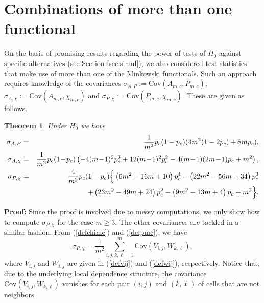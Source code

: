\documentclass[12pt]{article}
\newtheorem{theorem}{\bf{Theorem}}[section]
\begin{document}







\section{Combinations of more than one functional}\label{sec:3Mink.test}
On the basis of promising results regarding the power of tests of $H_0$ against specific alternatives (see Section \ref{sec:simul}), we also considered test statistics
that make use of more than one of the Minkowski functionals. Such an approach requires knowledge of the covariances
$\sigma_{A,P}:=\mbox{Cov}(A_{m,c},P_{m,c})$, $\sigma_{A,\chi}:=\mbox{Cov}(A_{m,c},\chi_{m,c})$ and $\sigma_{P,\chi}:=\mbox{Cov}(P_{m,c},\chi_{m,c})$. These are given as follows.
\begin{theorem}\label{covarMF} Under $H_0$ we have
\begin{eqnarray*}
\sigma_{A,P}&=&\frac{1}{m^2}p_c(1-p_c)(4m^2(1-2p_c)+8mp_c),\\
\sigma_{A,\chi}&=&\frac{1}{m^2}p_c(1\! -\! p_c)\left(-4(m\! -\! 1)^2p_c^3+12(m\! -\! 1)^2p_c^2-4(m\! -\! 1)(2m\! -\! 1)p_c+m^2\right),\\
\sigma_{P,\chi}&=&\frac{4}{m^2}p_c(1-p_c)\Big{\{}\left(6m^2-16m+10\right)p_c^4-\left(22m^2-56m+34\right)p_c^3\\
&& +\left(23m^2-49m+24\right)p_c^2-\left(9m^2-13m+4\right)p_c+m^2\Big{\}}.
\end{eqnarray*}
\end{theorem}
{\bf Proof:} Since the proof is involved due to messy computations, we only show how to compute $\sigma_{P,\chi}$ for the case $m\ge3$. The other covariances are tackled in a similar fashion.
From (\ref{defchimc}) and (\ref{defpmc}), we have
\begin{equation*}
\sigma_{P,\chi}=\frac1{m^2}\sum_{i,j,k,\ell=1}^m\mbox{Cov}(V_{i,j},W_{k,\ell}),
\end{equation*}
where $V_{i,j}$ and $W_{i,j}$ are given in (\ref{defvij}) and (\ref{defwij}), respectively. Notice that,
due to the underlying local dependence structure, the covariance $\mbox{Cov}(V_{i,j},W_{k,\ell})$ vanishes for each pair $(i,j)$ and $(k,\ell)$ of cells that are not neighbors
\end{document}
